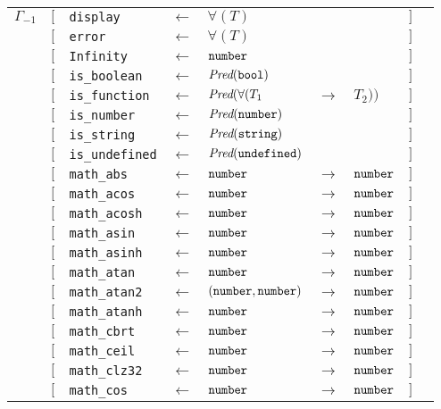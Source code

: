 \begin{tabular}[fragile]{lllllllll}
$\Gamma_{-1}$
& $[$ & \texttt{display}      & $\leftarrow$  & $\forall(T)$ & & & $]$ \\
& $[$ & \texttt{error}      & $\leftarrow$  & $\forall(T)$ & & & $]$ \\
& $[$ & \texttt{Infinity}      & $\leftarrow$  & $\texttt{number}$ & & & $]$ \\
& $[$ & \texttt{is\_boolean}   & $\leftarrow$  & $\textit{Pred}(\texttt{bool})$ & & & $]$ \\
& $[$ & \texttt{is\_function}  & $\leftarrow$  & $\textit{Pred}(\forall(T_1$ & $\rightarrow$ & $T_2))$ & $]$ \\
& $[$ & \texttt{is\_number}    & $\leftarrow$  & $\textit{Pred}(\texttt{number})$ & & & $]$ \\
& $[$ & \texttt{is\_string}    & $\leftarrow$  & $\textit{Pred}(\texttt{string})$ & & & $]$ \\
& $[$ & \texttt{is\_undefined} & $\leftarrow$  & $\textit{Pred}(\texttt{undefined})$ & & & $]$ \\
& $[$ & \texttt{math\_abs} & $\leftarrow$  & $\texttt{number}$ & $\rightarrow$ & $\texttt{number}$ & $]$ \\
& $[$ & \texttt{math\_acos} & $\leftarrow$  & $\texttt{number}$ & $\rightarrow$ & $\texttt{number}$ & $]$ \\
& $[$ & \texttt{math\_acosh} & $\leftarrow$  & $\texttt{number}$ & $\rightarrow$ & $\texttt{number}$ & $]$ \\
& $[$ & \texttt{math\_asin} & $\leftarrow$  & $\texttt{number}$ & $\rightarrow$ & $\texttt{number}$ & $]$ \\
& $[$ & \texttt{math\_asinh} & $\leftarrow$  & $\texttt{number}$ & $\rightarrow$ & $\texttt{number}$ & $]$ \\
& $[$ & \texttt{math\_atan} & $\leftarrow$  & $\texttt{number}$ & $\rightarrow$ & $\texttt{number}$ & $]$ \\
& $[$ & \texttt{math\_atan2} & $\leftarrow$  & $(\texttt{number}, \texttt{number})$ & $\rightarrow$ & $\texttt{number}$ & $]$ \\
& $[$ & \texttt{math\_atanh} & $\leftarrow$  & $\texttt{number}$ & $\rightarrow$ & $\texttt{number}$ & $]$ \\
& $[$ & \texttt{math\_cbrt} & $\leftarrow$  & $\texttt{number}$ & $\rightarrow$ & $\texttt{number}$ & $]$ \\
& $[$ & \texttt{math\_ceil} & $\leftarrow$  & $\texttt{number}$ & $\rightarrow$ & $\texttt{number}$ & $]$ \\
& $[$ & \texttt{math\_clz32} & $\leftarrow$  & $\texttt{number}$ & $\rightarrow$ & $\texttt{number}$ & $]$ \\
& $[$ & \texttt{math\_cos} & $\leftarrow$  & $\texttt{number}$ & $\rightarrow$ & $\texttt{number}$ & $]$ \\

\end{tabular}
